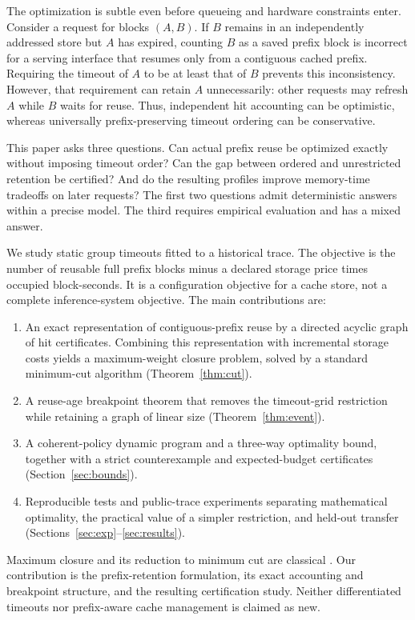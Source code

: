 \documentclass[11pt,a4paper]{article}
\begin{document}
The optimization is subtle even before queueing and hardware constraints enter.
Consider a request for blocks $(A,B)$. If $B$ remains in an independently addressed
store but $A$ has expired, counting $B$ as a saved prefix block is incorrect for a
serving interface that resumes only from a contiguous cached prefix. Requiring
the timeout of $A$ to be at least that of $B$ prevents this inconsistency. However,
that requirement can retain $A$ unnecessarily: other requests may refresh $A$
while $B$ waits for reuse. Thus, independent hit accounting can be optimistic,
whereas universally prefix-preserving timeout ordering can be conservative.

This paper asks three questions. Can actual prefix reuse be optimized exactly
without imposing timeout order? Can the gap between ordered and unrestricted
retention be certified? And do the resulting profiles improve memory-time
tradeoffs on later requests? The first two questions admit deterministic answers
within a precise model. The third requires empirical evaluation and has a mixed
answer.

We study static group timeouts fitted to a historical trace. The objective is the
number of reusable full prefix blocks minus a declared storage price times
occupied block-seconds. It is a configuration objective for a cache store, not a
complete inference-system objective. The main contributions are:
\begin{enumerate}
\item An exact representation of contiguous-prefix reuse by a directed acyclic
graph of hit certificates. Combining this representation with incremental
storage costs yields a maximum-weight closure problem, solved by a standard
minimum-cut algorithm (Theorem~\ref{thm:cut}).
\item A reuse-age breakpoint theorem that removes the timeout-grid restriction
while retaining a graph of linear size (Theorem~\ref{thm:event}).
\item A coherent-policy dynamic program and a three-way optimality bound,
together with a strict counterexample and expected-budget certificates
(Section~\ref{sec:bounds}).
\item Reproducible tests and public-trace experiments separating mathematical
optimality, the practical value of a simpler restriction, and held-out transfer
(Sections~\ref{sec:exp}--\ref{sec:results}).
\end{enumerate}
Maximum closure and its reduction to minimum cut are classical \cite{picard}.
Our contribution is the prefix-retention formulation, its exact accounting and
breakpoint structure, and the resulting certification study. Neither differentiated
timeouts nor prefix-aware cache management is claimed as new.
\end{document}
